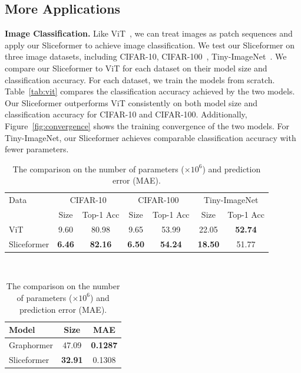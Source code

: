 \subsection{More Applications}
\textbf{Image Classification.} 
Like ViT~\cite{dosovitskiy2021an}, we can treat images as patch sequences and apply our Sliceformer to achieve image classification.
We test our Sliceformer on three image datasets, including CIFAR-10, CIFAR-100~\cite{krizhevsky2009learning}, Tiny-ImageNet~\cite{le2015tiny}. 
We compare our Sliceformer to ViT for each dataset on their model size and classification accuracy. 
For each dataset, we train the models from scratch.
Table~\ref{tab:vit} compares the classification accuracy achieved by the two models. 
Our Sliceformer outperforms ViT consistently on both model size and classification accuracy for CIFAR-10 and CIFAR-100.
Additionally, Figure~\ref{fig:convergence} shows the training convergence of the two models. 
For Tiny-ImageNet, our Sliceformer achieves comparable classification accuracy with fewer parameters.


\begin{table}[t]
\begin{minipage}[t]{0.65\linewidth}
  \centering
  \caption{The comparison for our Sliceformer and ViT on the number of parameters ($\times 10^6$) and classification accuracy (\%).\label{tab:vit}}
  \small{
  \tabcolsep=3pt
    \begin{tabular}{l|cc|cc|cc}
    \toprule
    Data &\multicolumn{2}{c|}{CIFAR-10} &\multicolumn{2}{c|}{CIFAR-100} &\multicolumn{2}{c}{Tiny-ImageNet}\\
     & Size & Top-1 Acc & Size & Top-1 Acc & Size & Top-1 Acc\\
    \midrule
    ViT & 9.60 & 80.98 & 9.65 & 53.99 & 22.05 & \textbf{52.74}\\
    Sliceformer & \textbf{6.46} & \textbf{82.16} & \textbf{6.50} & \textbf{54.24} & \textbf{18.50} & 51.77 \\
    \bottomrule
    \end{tabular}
    }
\end{minipage}
~~
\begin{minipage}[t]{0.32\linewidth}
  \centering
  \caption{The comparison on the number of parameters ($\times 10^6$) and prediction error (MAE).\label{tab:graphormer}}
  \small{
  \tabcolsep=4pt
    \begin{tabular}{l|cc}
    \toprule
    Model & Size &MAE \\
    \midrule
    Graphormer & 47.09 & \textbf{0.1287} \\
    Sliceformer & \textbf{32.91} & 0.1308 \\
    \bottomrule
    \end{tabular}
    }
\end{minipage}
\end{table}

